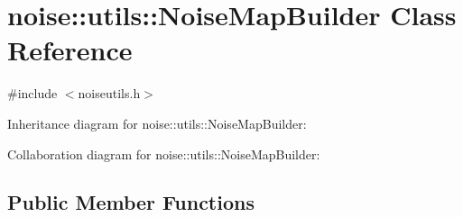 \hypertarget{classnoise_1_1utils_1_1_noise_map_builder}{\section{noise\+:\+:utils\+:\+:Noise\+Map\+Builder Class Reference}
\label{classnoise_1_1utils_1_1_noise_map_builder}
}


{\ttfamily \#include $<$noiseutils.\+h$>$}



Inheritance diagram for noise\+:\+:utils\+:\+:Noise\+Map\+Builder\+:


Collaboration diagram for noise\+:\+:utils\+:\+:Noise\+Map\+Builder\+:
\subsection*{Public Member Functions}
